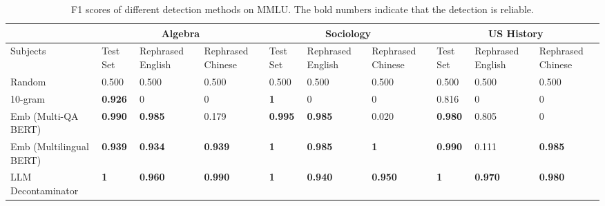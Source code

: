 
\begin{table}[h]
\centering
\caption{F1 scores of different detection methods on MMLU. The bold numbers indicate that the detection is reliable.}
\label{table:f1_scores}
\footnotesize
\begin{tabularx}{\textwidth}{l|XXX|XXX|XXX}
\toprule
& \multicolumn{3}{c|}{Algebra} & \multicolumn{3}{c|}{Sociology} & \multicolumn{3}{c}{US History} \\
\midrule
Subjects & Test Set & Rephrased English & Rephrased Chinese & Test Set & Rephrased English & Rephrased Chinese & Test Set & Rephrased English & Rephrased Chinese \\
\midrule
Random & 0.500 & 0.500 & 0.500 & 0.500 & 0.500 & 0.500 & 0.500 & 0.500 & 0.500 \\
10-gram & \textbf{0.926} & 0 & 0 & \textbf{1} & 0 & 0 & 0.816 & 0 & 0 \\
Emb (Multi-QA BERT) & \textbf{0.990} & \textbf{0.985} & 0.179 & \textbf{0.995} & \textbf{0.985} & 0.020 & \textbf{0.980} & 0.805 & 0 \\
Emb (Multilingual BERT) & \textbf{0.939} & \textbf{0.934} & \textbf{0.939} & \textbf{1} & \textbf{0.985} & \textbf{1} & \textbf{0.990} & 0.111 & \textbf{0.985} \\
LLM Decontaminator & \textbf{1} & \textbf{0.960} & \textbf{0.990} & \textbf{1} & \textbf{0.940} & \textbf{0.950} & \textbf{1} & \textbf{0.970} & \textbf{0.980} \\
\bottomrule
\end{tabularx}
\vspace{-10pt}
\end{table}





